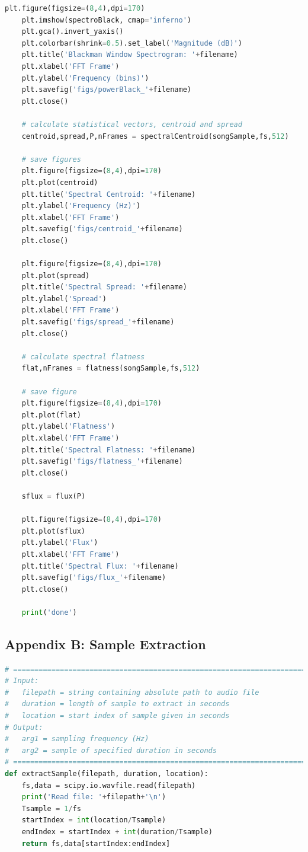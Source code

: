 \documentclass[11pt,a4paper]{article}
\begin{document}
\begin{lstlisting}[language=Python,label={lst:main}]
    plt.figure(figsize=(8,4),dpi=170)
    plt.imshow(spectroBlack, cmap='inferno')
    plt.gca().invert_yaxis()
    plt.colorbar(shrink=0.5).set_label('Magnitude (dB)')
    plt.title('Blackman Window Spectrogram: '+filename)
    plt.xlabel('FFT Frame')
    plt.ylabel('Frequency (bins)')
    plt.savefig('figs/powerBlack_'+filename)
    plt.close()

    # calculate statistical vectors, centroid and spread
    centroid,spread,P,nFrames = spectralCentroid(songSample,fs,512)

    # save figures
    plt.figure(figsize=(8,4),dpi=170)
    plt.plot(centroid)
    plt.title('Spectral Centroid: '+filename)
    plt.ylabel('Frequency (Hz)')
    plt.xlabel('FFT Frame')
    plt.savefig('figs/centroid_'+filename)
    plt.close()

    plt.figure(figsize=(8,4),dpi=170)
    plt.plot(spread)
    plt.title('Spectral Spread: '+filename)
    plt.ylabel('Spread')
    plt.xlabel('FFT Frame')
    plt.savefig('figs/spread_'+filename)
    plt.close()

    # calculate spectral flatness
    flat,nFrames = flatness(songSample,fs,512)

    # save figure
    plt.figure(figsize=(8,4),dpi=170)
    plt.plot(flat)
    plt.ylabel('Flatness')
    plt.xlabel('FFT Frame')
    plt.title('Spectral Flatness: '+filename)
    plt.savefig('figs/flatness_'+filename)
    plt.close()

    sflux = flux(P)

    plt.figure(figsize=(8,4),dpi=170)
    plt.plot(sflux)
    plt.ylabel('Flux')
    plt.xlabel('FFT Frame')
    plt.title('Spectral Flux: '+filename)
    plt.savefig('figs/flux_'+filename)
    plt.close()

    print('done')
	\end{lstlisting}
	
\pagebreak

\subsection{Appendix B: Sample Extraction} \label{app:extractsample}
	\begin{lstlisting}[language=Python,label={lst:extractsample}]
# =============================================================================
# Input:
#   filepath = string containing absolute path to audio file
#   duration = length of sample to extract in seconds
#   location = start index of sample given in seconds
# Output:
#   arg1 = sampling frequency (Hz)
#   arg2 = sample of specified duration in seconds
# =============================================================================
def extractSample(filepath, duration, location):
    fs,data = scipy.io.wavfile.read(filepath)
    print('Read file: '+filepath+'\n')
    Tsample = 1/fs
    startIndex = int(location/Tsample)
    endIndex = startIndex + int(duration/Tsample)
    return fs,data[startIndex:endIndex]
	\end{lstlisting}
\end{document}

